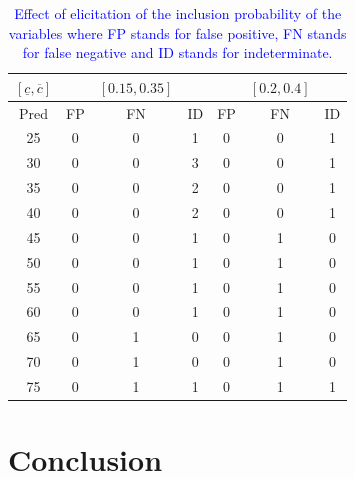 \documentclass[preprint,12pt]{elsarticle}
\newcommand{\added}[1]{\textcolor{blue}{#1}}
\begin{document}
\begin{table}[ht]
	\centering
	\begin{tabular}{c|ccc|ccc}
		\hline
		$[\underline{c},\overline{c}]$ &  &   $[0.15,0.35]$ &    &  & $[0.2,0.4]$ &    \\
		\hline
		Pred & FP & FN & ID & FP & FN & ID  \\ 
		\hline
		25 & 0 & 0 & 1 & 0 & 0 & 1  \\ 
		30 & 0 & 0 & 3 & 0 & 0 & 1  \\ 
		35 & 0 & 0 & 2 & 0 & 0 & 1  \\ 
		40 & 0 & 0 & 2 & 0 & 0 & 1  \\ 
		45 & 0 & 0 & 1 & 0 & 1 & 0  \\ 
		50 & 0 & 0 & 1 & 0 & 1 & 0  \\ 
		55 & 0 & 0 & 1 & 0 & 1 & 0  \\ 
		60 & 0 & 0 & 1 & 0 & 1 & 0  \\ 
		65 & 0 & 1 & 0 & 0 & 1 & 0  \\ 
		70 & 0 & 1 & 0 & 0 & 1 & 0  \\ 
		75 & 0 & 1 & 1 & 0 & 1 & 1  \\ 
		\hline
	\end{tabular}
	\caption{\added{Effect of elicitation of the inclusion probability of the variables where FP stands for false positive, FN stands for false negative and ID stands for indeterminate. }}
	\label{tab:comp:elict}
\end{table}

\section{Conclusion}\label{sec:conc}
\end{document}
